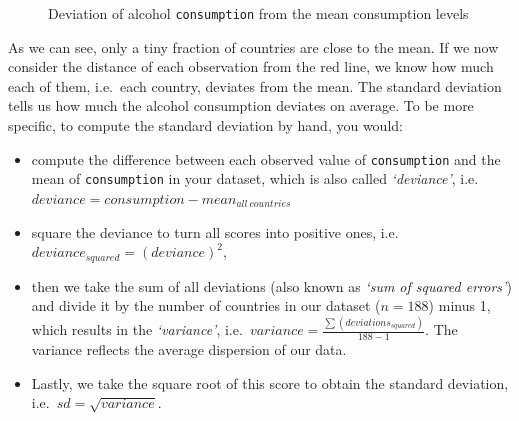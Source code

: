 \documentclass[
  letterpaper,
]{krantz}
\begin{document}
\begin{figure}


\caption{\label{fig-alcohol-consumption-deviation}Deviation of alcohol
\texttt{consumption} from the mean consumption levels}

\end{figure}%

As we can see, only a tiny fraction of countries are close to the mean.
If we now consider the distance of each observation from the red line,
we know how much each of them, i.e.~each country, deviates from the
mean. The standard deviation tells us how much the alcohol consumption
deviates on average. To be more specific, to compute the standard
deviation by hand, you would:

\begin{itemize}
\item
  compute the difference between each observed value of
  \texttt{consumption} and the mean of \texttt{consumption} in your
  dataset, which is also called \emph{`deviance'},
  i.e.~\(deviance = consumption - mean_{all\ countries}\)
\item
  square the deviance to turn all scores into positive ones,
  i.e.~\(deviance_{squared} = (deviance)^2\),
\item
  then we take the sum of all deviations (also known as \emph{`sum of
  squared errors'}) and divide it by the number of countries in our
  dataset (\(n = 188\)) minus 1, which results in the \emph{`variance'},
  i.e.~\(variance = \frac{\sum(deviations_{squared})}{188-1}\). The
  variance reflects the average dispersion of our data.
\item
  Lastly, we take the square root of this score to obtain the standard
  deviation, i.e.~\(sd = \sqrt{variance}\).
\end{itemize}
\end{document}
